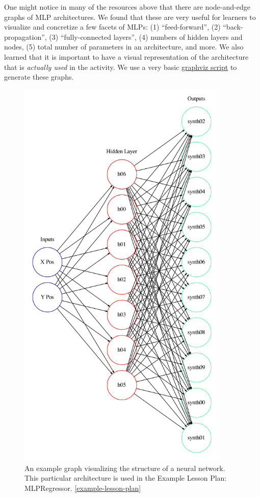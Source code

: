 \documentclass{article}
\begin{document}
One might notice in many of the resources above that there are
node-and-edge graphs of MLP architectures. We found that these are very
useful for learners to visualize and concretize a few facets of MLPs:
(1) ``feed-forward'', (2) ``back-propagation'', (3) ``fully-connected
layers'', (4) numbers of hidden layers and nodes, (5) total number of
parameters in an architecture, and more. We also learned that it is
important to have a visual representation of the architecture that is
\emph{actually used} in the activity. We use a very basic
\href{https://github.com/flucoma/graphics/tree/main/nn_visualizer}{graphviz
script} to generate these graphs.

\begin{figure}[H]
\centering
\includegraphics[width=0.9\textwidth]{./figures/nn-visualization.png}
\caption{An example graph visualizing the structure of a neural network. This particular architecture is used in the Example Lesson Plan: MLPRegressor. \ref{example-lesson-plan}}
\label{fig:nn-visualization}
\end{figure}
\end{document}
